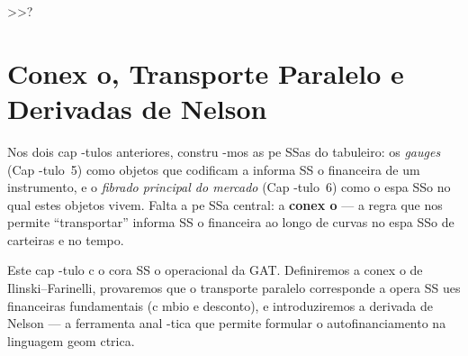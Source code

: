  >>?%
\chapter{Conex o, Transporte Paralelo e Derivadas de Nelson}

Nos dois cap -tulos anteriores, constru -mos as pe SSas do tabuleiro: os
\textit{gauges} (Cap -tulo~5) como objetos que codificam a informa SS o
financeira de um instrumento, e o \textit{fibrado principal do mercado}
(Cap -tulo~6) como o espa SSo no qual estes objetos vivem. Falta a pe SSa
central: a \textbf{conex o} --- a regra que nos permite ``transportar''
informa SS o financeira ao longo de curvas no espa SSo de carteiras e no
tempo.

Este cap -tulo c o cora SS o operacional da GAT. Definiremos a conex o de
Ilinski--Farinelli, provaremos que o transporte paralelo corresponde a
opera SS ues financeiras fundamentais (c mbio e desconto), e
introduziremos a derivada de Nelson --- a ferramenta anal -tica que
permite formular o autofinanciamento na linguagem geom ctrica.

